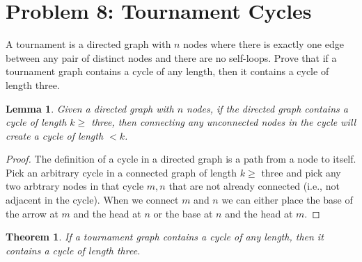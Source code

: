 \documentclass[10pt,letter]{article}
\newtheorem*{thm}{Theorem}
\newtheorem{lem}{Lemma}
\begin{document}
\pagebreak

\section*{Problem 8: Tournament Cycles}
A tournament is a directed graph with $n$ nodes where there is exactly one edge between any pair of distinct nodes and there are no self-loops. Prove that if a tournament graph contains a cycle of any length, then it contains a cycle of length three.

\begin{lem} Given a directed graph with $n$ nodes, if the directed graph contains a cycle of length $k \ge$ three, then connecting any unconnected nodes in the cycle will create a cycle of length $< k$.
\end{lem}

\begin{proof} The definition of a cycle in a directed graph is a path from a node to itself. Pick an arbitrary cycle in a connected graph of length $k \ge$ three and pick any two arbtrary nodes in that cycle $m, n$ that are not already connected (i.e., not adjacent in the cycle). When we connect $m$ and $n$ we can either place the base of the arrow at $m$ and the head at $n$ or the base at $n$ and the head at $m$. 

\end{proof}

\begin{thm} If a tournament graph contains a cycle of any length, then it contains a cycle of length three.
\end{thm}
\end{document}
